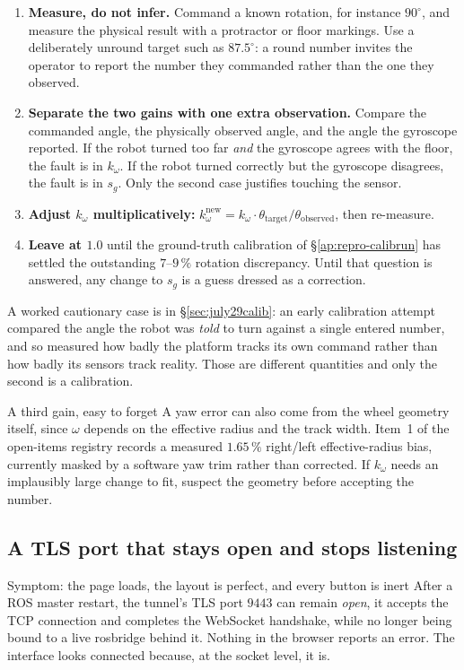 \begin{enumerate}[leftmargin=1.6em]
\item \textbf{Measure, do not infer.} Command a known rotation, for instance
  $90^\circ$, and measure the physical result with a protractor or floor
  markings. Use a deliberately unround target such as $87.5^\circ$: a round
  number invites the operator to report the number they commanded rather than
  the one they observed.
\item \textbf{Separate the two gains with one extra observation.} Compare the
  commanded angle, the physically observed angle, and the angle the gyroscope
  reported. If the robot turned too far \emph{and} the gyroscope agrees with
  the floor, the fault is in $k_\omega$. If the robot turned correctly but the
  gyroscope disagrees, the fault is in $s_g$. Only the second case justifies
  touching the sensor.
\item \textbf{Adjust $k_\omega$ multiplicatively:}
  $k_\omega^{\mathrm{new}} = k_\omega \cdot
   \theta_{\mathrm{target}} / \theta_{\mathrm{observed}}$, then re-measure.
\item \textbf{Leave  at $1.0$} until the ground-truth
  calibration of \S\ref{ap:repro-calibrun} has settled the outstanding
  $7$--$9\,\%$ rotation discrepancy. Until that question is answered, any
  change to $s_g$ is a guess dressed as a correction.
\end{enumerate}

\noindent A worked cautionary case is in \S\ref{sec:july29calib}: an early
calibration attempt compared the angle the robot was \emph{told} to turn
against a single entered number, and so measured how badly the platform
tracks its own command rather than how badly its sensors track reality. Those
are different quantities and only the second is a calibration.

\begin{trapbox}{A third gain, easy to forget}
A yaw error can also come from the wheel geometry itself, since
$\omega$ depends on the effective radius and the track width. Item~1 of the
open-items registry records a measured $1.65\,\%$ right/left effective-radius
bias, currently masked by a software yaw trim rather than corrected. If
$k_\omega$ needs an implausibly large change to fit, suspect the geometry
before accepting the number.
\end{trapbox}


\subsection{A TLS port that stays open and stops listening}
\label{ap:trap-zombieport}
\begin{trapbox}{Symptom: the page loads, the layout is perfect, and every
button is inert}
After a ROS master restart, the tunnel's TLS port $9443$ can remain
\emph{open}, it accepts the TCP connection and completes the WebSocket
handshake, while no longer being bound to a live rosbridge behind it.
Nothing in the browser reports an error. The interface looks connected
because, at the socket level, it is.
\end{trapbox}

